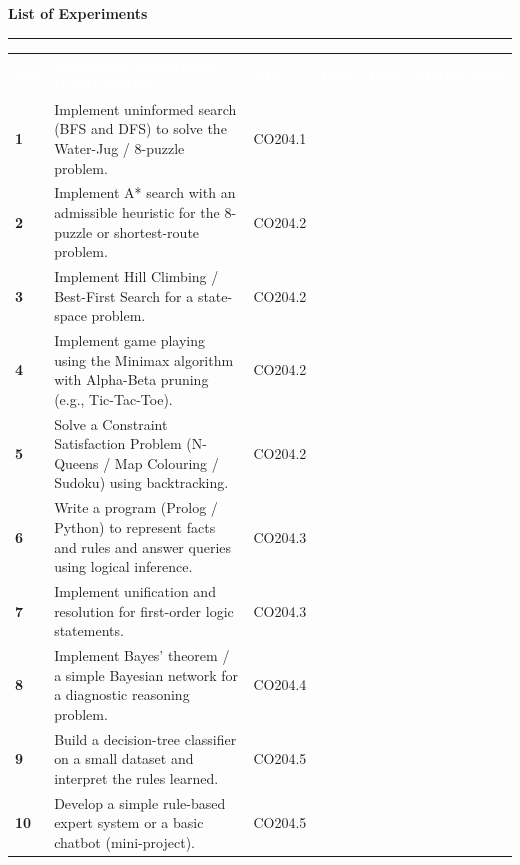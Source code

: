 \documentclass[11pt,a4paper]{article}
\begin{document}
\clearpage
{}
{\sffamily\bfseries\Large\color{navy}List of Experiments}\par
{\color{gold}\rule{\textwidth}{1.2pt}}

\renewcommand{\arraystretch}{1.5}
{\small
\begin{tabularx}{\textwidth}{>{\centering\arraybackslash\sffamily\bfseries}p{0.8cm}X>{\centering\arraybackslash}p{1.5cm}>{\centering\arraybackslash}p{0.9cm}>{\centering\arraybackslash}p{1.5cm}>{\centering\arraybackslash}p{1.1cm}>{\centering\arraybackslash}p{1.5cm}}
\rowcolor{navy}\textcolor{white}{No.} & \textcolor{white}{\sffamily\bfseries Laboratory Experiment / Practical Title} & \textcolor{white}{\sffamily\bfseries CO} & \textcolor{white}{\sffamily\bfseries Page} & \textcolor{white}{\sffamily\bfseries Date} & \textcolor{white}{\sffamily\bfseries Marks} & \textcolor{white}{\sffamily\bfseries Sign}\\
1 & Implement uninformed search (BFS and DFS) to solve the Water-Jug / 8-puzzle problem. & CO204.1 & \pageref{exp:1} & & & \\
\rowcolor{navy!8} 2 & Implement A* search with an admissible heuristic for the 8-puzzle or shortest-route problem. & CO204.2 & \pageref{exp:2} & & & \\
3 & Implement Hill Climbing / Best-First Search for a state-space problem. & CO204.2 & \pageref{exp:3} & & & \\
\rowcolor{navy!8} 4 & Implement game playing using the Minimax algorithm with Alpha-Beta pruning (e.g., Tic-Tac-Toe). & CO204.2 & \pageref{exp:4} & & & \\
5 & Solve a Constraint Satisfaction Problem (N-Queens / Map Colouring / Sudoku) using backtracking. & CO204.2 & \pageref{exp:5} & & & \\
\rowcolor{navy!8} 6 & Write a program (Prolog / Python) to represent facts and rules and answer queries using logical inference. & CO204.3 & \pageref{exp:6} & & & \\
7 & Implement unification and resolution for first-order logic statements. & CO204.3 & \pageref{exp:7} & & & \\
\rowcolor{navy!8} 8 & Implement Bayes' theorem / a simple Bayesian network for a diagnostic reasoning problem. & CO204.4 & \pageref{exp:8} & & & \\
9 & Build a decision-tree classifier on a small dataset and interpret the rules learned. & CO204.5 & \pageref{exp:9} & & & \\
\rowcolor{navy!8} 10 & Develop a simple rule-based expert system or a basic chatbot (mini-project). & CO204.5 & \pageref{exp:10} & & & \\
\end{tabularx}}
\end{document}
